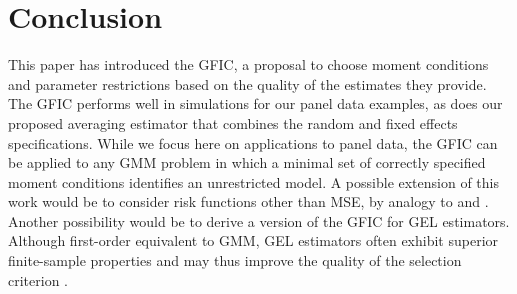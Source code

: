 
\section{Conclusion}
\label{sec:conclude}
This paper has introduced the GFIC, a proposal to choose moment conditions and parameter restrictions based on the quality of the estimates they provide. 
The GFIC performs well in simulations for our panel data examples, as does our proposed averaging estimator that combines the random and fixed effects specifications.
While we focus here on applications to panel data, the GFIC can be applied to any GMM problem in which a minimal set of correctly specified moment conditions identifies an unrestricted model. 
A possible extension of this work would be to consider risk functions other than MSE, by analogy to \cite{ClaeskensCroux2006} and \cite{ClaeskensHjort2008}.
Another possibility would be to derive a version of the GFIC for GEL estimators. 
Although first-order equivalent to GMM, GEL estimators often exhibit superior finite-sample properties and may thus improve the quality of the selection criterion \citep{NeweySmith}. 
